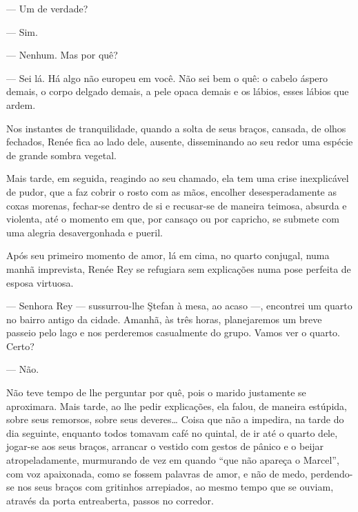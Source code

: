 --- Um de verdade?

--- Sim.

--- Nenhum. Mas por quê?

--- Sei lá. Há algo não europeu em você. Não sei bem o quê: o cabelo
áspero demais, o corpo delgado demais, a pele opaca demais e os lábios,
esses lábios que ardem.



Nos instantes de tranquilidade, quando a solta de seus braços, cansada,
de olhos fechados, Renée fica ao lado dele, ausente, disseminando ao seu
redor uma espécie de grande sombra vegetal.

Mais tarde, em seguida, reagindo ao seu chamado, ela tem uma crise
inexplicável de pudor, que a faz cobrir o rosto com as mãos, encolher
desesperadamente as coxas morenas, fechar-se dentro de si e recusar-se
de maneira teimosa, absurda e violenta, até o momento em que, por
cansaço ou por capricho, se submete com uma alegria desavergonhada e
pueril.

Após seu primeiro momento de amor, lá em cima, no quarto conjugal, numa
manhã imprevista, Renée Rey se refugiara sem explicações numa pose
perfeita de esposa virtuosa.

--- Senhora Rey --- sussurrou-lhe Ştefan à mesa, ao acaso ---, encontrei
um quarto no bairro antigo da cidade. Amanhã, às três horas,
planejaremos um breve passeio pelo lago e nos perderemos casualmente do
grupo. Vamos ver o quarto. Certo?

--- Não.

Não teve tempo de lhe perguntar por quê, pois o marido justamente se
aproximara. Mais tarde, ao lhe pedir explicações, ela falou, de maneira
estúpida, sobre seus remorsos, sobre seus deveres\ldots{} Coisa que não
a impedira, na tarde do dia seguinte, enquanto todos tomavam café no
quintal, de ir até o quarto dele, jogar-se aos seus braços, arrancar o
vestido com gestos de pânico e o beijar atropeladamente, murmurando de
vez em quando ``que não apareça o Marcel'', com voz apaixonada, como se
fossem palavras de amor, e não de medo, perdendo-se nos seus braços com
gritinhos arrepiados, ao mesmo tempo que se ouviam, através da porta
entreaberta, passos no corredor.

